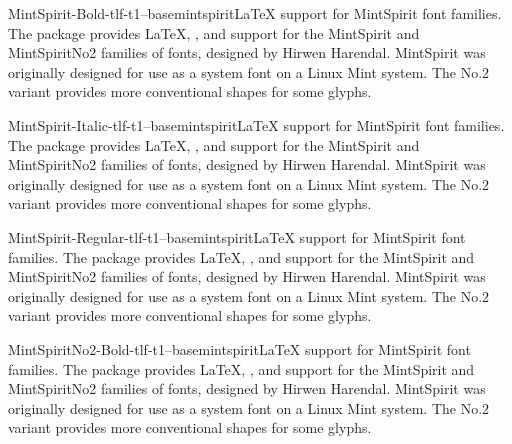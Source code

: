 \documentclass{ddltxtyp}
\begin{document}
\begin{package}{MintSpirit-Bold-tlf-t1--base}{mintspirit}{{\LaTeX} support for MintSpirit font families.}
The package provides {\LaTeX}, {\pdfLaTeX}, {\XeLaTeX} and {\LuaLaTeX}
support for the MintSpirit and MintSpiritNo2 families of fonts,
designed by Hirwen Harendal. MintSpirit was originally designed
for use as a system font on a Linux Mint system. The No.2
variant provides more conventional shapes for some glyphs.
\end{package}
\begin{package}{MintSpirit-Italic-tlf-t1--base}{mintspirit}{{\LaTeX} support for MintSpirit font families.}
The package provides {\LaTeX}, {\pdfLaTeX}, {\XeLaTeX} and {\LuaLaTeX}
support for the MintSpirit and MintSpiritNo2 families of fonts,
designed by Hirwen Harendal. MintSpirit was originally designed
for use as a system font on a Linux Mint system. The No.2
variant provides more conventional shapes for some glyphs.
\end{package}
\begin{package}{MintSpirit-Regular-tlf-t1--base}{mintspirit}{{\LaTeX} support for MintSpirit font families.}
The package provides {\LaTeX}, {\pdfLaTeX}, {\XeLaTeX} and {\LuaLaTeX}
support for the MintSpirit and MintSpiritNo2 families of fonts,
designed by Hirwen Harendal. MintSpirit was originally designed
for use as a system font on a Linux Mint system. The No.2
variant provides more conventional shapes for some glyphs.
\end{package}
\begin{package}{MintSpiritNo2-Bold-tlf-t1--base}{mintspirit}{{\LaTeX} support for MintSpirit font families.}
The package provides {\LaTeX}, {\pdfLaTeX}, {\XeLaTeX} and {\LuaLaTeX}
support for the MintSpirit and MintSpiritNo2 families of fonts,
designed by Hirwen Harendal. MintSpirit was originally designed
for use as a system font on a Linux Mint system. The No.2
variant provides more conventional shapes for some glyphs.
\end{package}
\end{document}

